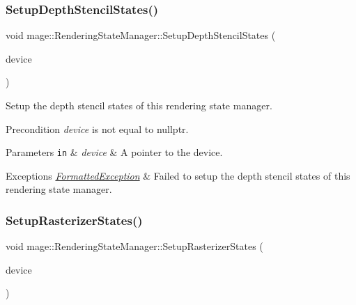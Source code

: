 \subsubsection{\texorpdfstring{Setup\+Depth\+Stencil\+States()}{SetupDepthStencilStates()}}
{\footnotesize\ttfamily void mage\+::\+Rendering\+State\+Manager\+::\+Setup\+Depth\+Stencil\+States (\begin{DoxyParamCaption}\item[{I\+D3\+D11\+Device2 $\ast$}]{device }\end{DoxyParamCaption})\hspace{0.3cm}{\ttfamily [private]}}

Setup the depth stencil states of this rendering state manager.

\begin{DoxyPrecond}{Precondition}
{\itshape device} is not equal to {\ttfamily nullptr}. 
\end{DoxyPrecond}

\begin{DoxyParams}[1]{Parameters}
\mbox{\tt in}  & {\em device} & A pointer to the device. \\
\hline
\end{DoxyParams}

\begin{DoxyExceptions}{Exceptions}
{\em \hyperlink{structmage_1_1_formatted_exception}{Formatted\+Exception}} & Failed to setup the depth stencil states of this rendering state manager. \\
\hline
\end{DoxyExceptions}
\hypertarget{classmage_1_1_rendering_state_manager_a442a2c0fdbde97eddae013836e279e75}{}\label{classmage_1_1_rendering_state_manager_a442a2c0fdbde97eddae013836e279e75} 
\subsubsection{\texorpdfstring{Setup\+Rasterizer\+States()}{SetupRasterizerStates()}}
{\footnotesize\ttfamily void mage\+::\+Rendering\+State\+Manager\+::\+Setup\+Rasterizer\+States (\begin{DoxyParamCaption}\item[{I\+D3\+D11\+Device2 $\ast$}]{device }\end{DoxyParamCaption})\hspace{0.3cm}{\ttfamily [private]}}

